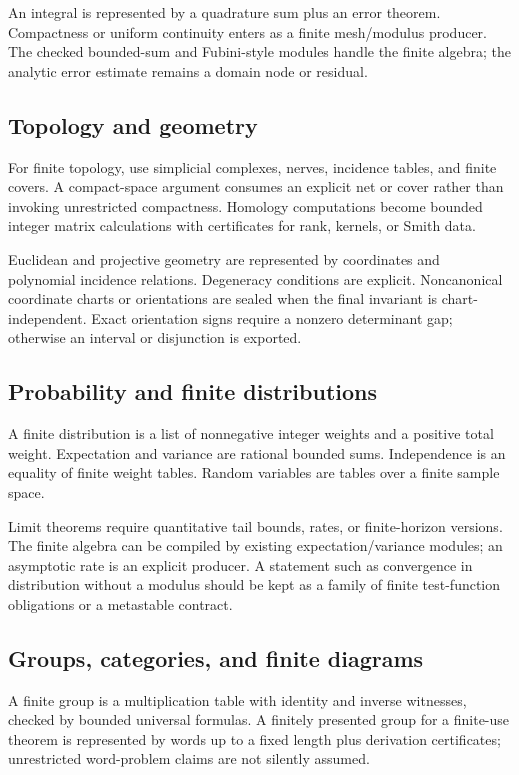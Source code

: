 An integral is represented by a quadrature sum plus an error theorem.  Compactness or uniform
continuity enters as a finite mesh/modulus producer.  The checked bounded-sum and Fubini-style modules
handle the finite algebra; the analytic error estimate remains a domain node or residual.

\subsection{Topology and geometry}

For finite topology, use simplicial complexes, nerves, incidence tables, and finite covers.  A
compact-space argument consumes an explicit net or cover rather than invoking unrestricted
compactness.  Homology computations become bounded integer matrix calculations with certificates for
rank, kernels, or Smith data.

Euclidean and projective geometry are represented by coordinates and polynomial incidence
relations.  Degeneracy conditions are explicit.  Noncanonical coordinate charts or orientations are
sealed when the final invariant is chart-independent.  Exact orientation signs require a nonzero
determinant gap; otherwise an interval or disjunction is exported.

\subsection{Probability and finite distributions}

A finite distribution is a list of nonnegative integer weights and a positive total weight.
Expectation and variance are rational bounded sums.  Independence is an equality of finite weight
tables.  Random variables are tables over a finite sample space.

Limit theorems require quantitative tail bounds, rates, or finite-horizon versions.  The finite
algebra can be compiled by existing expectation/variance modules; an asymptotic rate is an explicit
producer.  A statement such as convergence in distribution without a modulus should be kept as a
family of finite test-function obligations or a metastable contract.

\subsection{Groups, categories, and finite diagrams}

A finite group is a multiplication table with identity and inverse witnesses, checked by bounded
universal formulas.  A finitely presented group for a finite-use theorem is represented by words up
to a fixed length plus derivation certificates; unrestricted word-problem claims are not silently
assumed.

